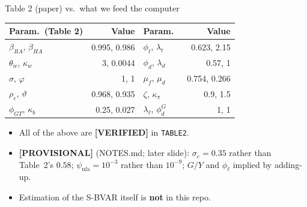 \documentclass[11pt,aspectratio=169]{beamer}
\begin{document}
\begin{frame}{Table 2 (paper) vs.\ what we feed the computer}
  \begin{center}
  {\footnotesize
  \begin{tabular}{@{}lrlr@{}}
    \toprule
    Param.\ (Table 2) & Value & Param.\ & Value \\
    \midrule
    $\beta_{RA}$, $\beta_{HA}$ & 0.995, 0.986 & $\phi_t$, $\lambda_t$ & 0.623, 2.15 \\
    $\theta_w$, $\kappa_w$ & 3, 0.0044 & $\phi_d$, $\lambda_d$ & 0.57, 1 \\
    $\sigma$, $\varphi$ & 1, 1 & $\mu_f$, $\mu_d$ & 0.754, 0.266 \\
    $\rho_e$, $\vartheta$ & 0.968, 0.935 & $\zeta$, $\kappa_\pi$ & 0.9, 1.5 \\
    $\phi_{GT}$, $\kappa_b$ & 0.25, 0.027 & $\lambda_{\ell}$, $\phi^G_d$ & 1, 1 \\
    \bottomrule
  \end{tabular}
  }
  \end{center}
  \vspace{0.3em}
  \begin{itemize}
    \item All of the above are \textbf{[VERIFIED]} in \texttt{TABLE2}.
    \item \textbf{[PROVISIONAL]} (NOTES.md; later slide): $\sigma_e=0.35$
          rather than Table~2's $0.58$; $\psi_{\mathrm{nfa}}=10^{-3}$ rather
          than $10^{-9}$; $G/Y$ and $\phi_{\ell}$ implied by adding-up.
    \item Estimation of the S-BVAR itself is \textbf{not} in this repo.
  \end{itemize}
\end{frame}

\end{document}
